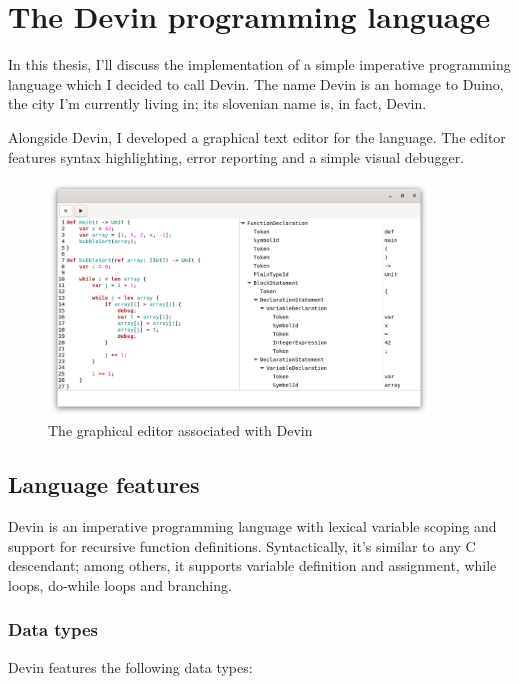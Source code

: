 \documentclass[UdineBachThesis,american,11pt,draft]{PhdThesis}
\begin{document}
  \chapter{The Devin programming language}

  In this thesis, I'll discuss the implementation of a simple imperative
  programming language which I decided to call Devin. The name Devin is an
  homage to Duino, the city I'm currently living in; its slovenian name is, in
  fact, Devin.

  Alongside Devin, I developed a graphical text editor for the language. The
  editor features syntax highlighting, error reporting and a simple visual
  debugger.

  \begin{figure}[h]
    \centering
    \includegraphics[width=0.9\textwidth]{2.png}
    \caption{The graphical editor associated with Devin}
  \end{figure}

  \section{Language features}

  Devin is an imperative programming language with lexical variable scoping and
  support for recursive function definitions. Syntactically, it's similar to any
  C descendant; among others, it supports variable definition and assignment,
  while loops, do-while loops and branching.

  \subsection{Data types}

  Devin features the following data types:
\end{document}
